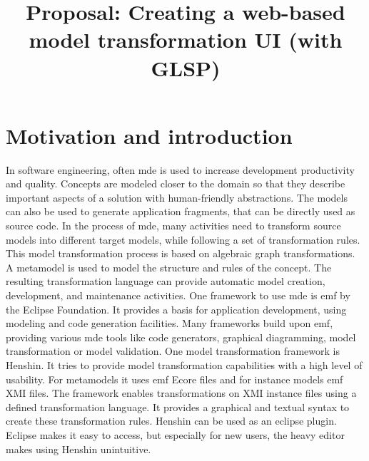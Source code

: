 \documentclass[conference,onecolumn]{IEEEtran}
\begin{document}
  \title{Proposal: Creating a web-based model transformation UI (with GLSP)}

  \author{
    }

  \maketitle

  \IEEEpeerreviewmaketitle

  \section{Motivation and introduction}
  \label{sec:motivation}

  In software engineering, often \ac{mde} is used to increase development productivity and quality. Concepts are modeled closer to the domain so that they describe important aspects of a solution with human-friendly abstractions. The models can also be used to generate application fragments, that can be directly used as source code. In the process of \ac{mde}, many activities need to transform source models into different target models, while following a set of transformation rules. This model transformation process is based on algebraic graph transformations. A metamodel is used to model the structure and rules of the concept. The resulting transformation language can provide automatic model creation, development, and maintenance activities. \cite{transformations-modeldriven} One framework to use \ac{mde} is \ac{emf} by the Eclipse Foundation. It provides a basis for application development, using modeling and code generation facilities. Many frameworks build upon \ac{emf}, providing various \ac{mde} tools like code generators, graphical diagramming, model transformation or model validation. \cite{emf} One model transformation framework is Henshin. \cite{henshin-repo} It tries to provide model transformation capabilities with a high level of usability. \cite{henshin-usability} For metamodels it uses \ac{emf} Ecore files and for instance models \ac{emf} XMI files. The framework enables transformations on XMI instance files using a defined transformation language. It provides a graphical and textual syntax to create these transformation rules. \cite{henshin-repo} Henshin can be used as an eclipse plugin. Eclipse makes it easy to access, but especially for new users, the heavy editor makes using Henshin unintuitive.
\end{document}
